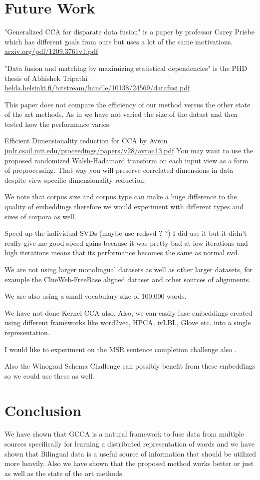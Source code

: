 \documentclass[11pt]{article}
\begin{document}
\section{Future Work}
\label{sec:futurework}
"Generalized CCA for disparate data fusion" is a paper by professor
Carey Priebe which has different goals from ours but uses a lot of the
same motivations. \url{arxiv.org/pdf/1209.3761v1.pdf} 

"Data fusion and matching by maximizing statistical dependencies" is
the PHD thesis of Abhishek Tripathi  
\url{helda.helsinki.fi/bitstream/handle/10138/24569/datafusi.pdf}

This paper does not compare the efficiency of our method versus the
other state of the art methods. As in we have not varied the size of
the datast and then tested how the performance varies. 

Efficient Dimensionality reduction for CCA by Avron
\url{jmlr.csail.mit.edu/proceedings/papers/v28/avron13.pdf} 
You may want to use the proposed randomized Walsh-Hadamard transform
on each input view as a form of preprocessing. That way you will
preserve correlated dimensions in data despite view-specific
dimensionality reduction.

We note that corpus size and corpus type can make a huge
  difference to the quality of embeddings therefore we would
  experiment with different types and sizes of corpora as well.
  
Speed up the individual SVDs (maybe use redsvd ? ?) I did use it but
it didn't really give me good speed gains because it was pretty bad at
low iterations and high iterations means that its performance becomes
the same as normal svd.

We are not using larger monolingual datasets as well as other larger
datasets, for example the ClueWeb-FreeBase aligned dataset and other
sources of alignments.

We are also using a small vocabulary size of 100,000 words.

We have not done Kernel CCA also. Also, we can easily fuse embeddings created using
different frameworks like word2vec, HPCA, ivLBL, Glove etc. into a single representation.

I would like to experiment on the MSR sentence completion challenge
also \cite{zweig2011MSRSCC,zweig2012msrchallenge}.

Also the Winograd Schema Challenge can possibly benefit from these
embeddings so we could use these as well.
\section{Conclusion}
We have shown that GCCA is a natural framework to fuse data from
multiple sources specifically for learning a distributed
representation of words and we have shown that Bilingual data is a useful
source of information that should be utilized more heavily. Also we
have shown that the proposed method works better or just as well as
the state of the art methods.
\end{document}
